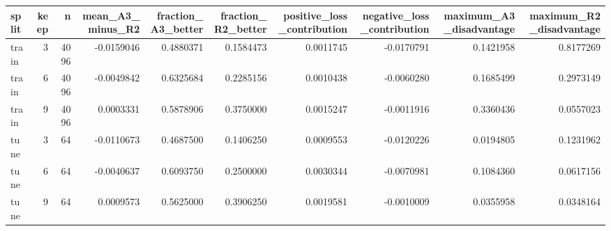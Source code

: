 \begin{tabular}{lrrrrrrrrr}
\toprule
split & keep & n & mean_A3_minus_R2 & fraction_A3_better & fraction_R2_better & positive_loss_contribution & negative_loss_contribution & maximum_A3_disadvantage & maximum_R2_disadvantage \\
\midrule
train & 3 & 4096 & -0.0159046 & 0.4880371 & 0.1584473 & 0.0011745 & -0.0170791 & 0.1421958 & 0.8177269 \\
train & 6 & 4096 & -0.0049842 & 0.6325684 & 0.2285156 & 0.0010438 & -0.0060280 & 0.1685499 & 0.2973149 \\
train & 9 & 4096 & 0.0003331 & 0.5878906 & 0.3750000 & 0.0015247 & -0.0011916 & 0.3360436 & 0.0557023 \\
tune & 3 & 64 & -0.0110673 & 0.4687500 & 0.1406250 & 0.0009553 & -0.0120226 & 0.0194805 & 0.1231962 \\
tune & 6 & 64 & -0.0040637 & 0.6093750 & 0.2500000 & 0.0030344 & -0.0070981 & 0.1084360 & 0.0617156 \\
tune & 9 & 64 & 0.0009573 & 0.5625000 & 0.3906250 & 0.0019581 & -0.0010009 & 0.0355958 & 0.0348164 \\
\bottomrule
\end{tabular}
